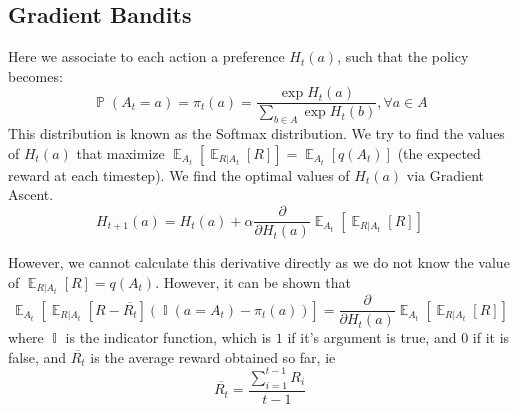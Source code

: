 \documentclass[12pt]{report}
\begin{document}
\subsection{Gradient Bandits}
Here we associate to each action a preference $H_{t}(a)$, such that the policy becomes:
\begin{equation}
    \mathop{\mathbb{P}}(A_{t} = a) = \pi_{t}(a) = \frac{\exp{H_{t}(a)}}{\sum\limits_{b \in A} \exp{H_{t}(b)}}, \forall a \in A
\end{equation}
This distribution is known as the Softmax distribution. We try to find the values of $H_{t}(a)$ that maximize $\mathop{\mathbb{E}}_{A_{t}}\left[\mathop{\mathbb{E}}_{R | A_{t}}\left[R\right]\right] = \mathop{\mathbb{E}}_{A_{t}}\left[q(A_{t})\right]$ (the expected reward at each timestep). 
We find the optimal values of $H_{t}(a)$ via Gradient Ascent.
\begin{equation}
    H_{t + 1}(a) = H_{t}(a) + \alpha \frac{\partial}{\partial H_{t}(a)} \mathop{\mathbb{E}}_{A_{t}}\left[\mathop{\mathbb{E}}_{R | A_{t}}\left[R\right]\right]
\end{equation}

However, we cannot calculate this derivative directly as we do not know the value of $\mathop{\mathbb{E}}_{R | A_{t}}\left[R\right] = q(A_{t})$. However, it can be shown that
\begin{equation}
    \mathop{\mathbb{E}}_{A_{t}}\left[\mathop{\mathbb{E}}_{R | A_{t}}\left[R - \overline{R_{t}}\right](\mathop{\mathbb{I}}(a = A_{t}) - \pi_{t}(a))\right] = \frac{\partial}{\partial H_{t}(a)}\mathop{\mathbb{E}}_{A_{t}}\left[\mathop{\mathbb{E}}_{R | A_{t}}\left[R\right]\right]
\end{equation}
where $\mathop{\mathbb{I}}$ is the indicator function, which is $1$ if it's argument is true, and $0$ if it is false, and $\overline{R_{t}}$ is the average reward obtained so far, ie
\begin{equation}
    \overline{R_{t}} = \frac{\sum\limits_{i = 1}^{t - 1} R_{i}}{t - 1}
\end{equation}
\end{document}
